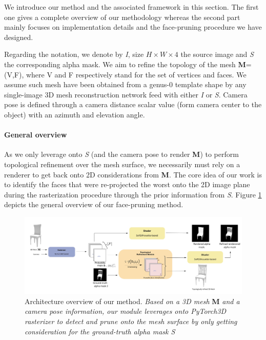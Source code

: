 We introduce our method and the associated framework in this section. The first one gives a complete overview of our methodology whereas the second part mainly focuses on implementation details and the face-pruning procedure we have designed. 

Regarding the notation, we denote by \textit{I}, size $H\times W \times 4$ the source image and \textit{S} the corresponding alpha mask. We aim to refine the topology of the mesh \textbf{M}=(V,F), where V and F respectively stand for the set of vertices and faces. We assume such mesh have been obtained from a genus-0 template shape by any single-image 3D mesh reconstruction network feed with either \textit{I} or \textit{S}. Camera pose is defined through a camera distance scalar value (form camera center to the object) with an azimuth and elevation angle. 

\paragraph{General overview} As we only leverage onto \textit{S} (and the camera pose to render \textbf{M}) to perform topological refinement over the mesh surface, we necessarily must rely on a renderer to get back onto 2D considerations from  \textbf{M}. The core idea of our work is to identify the faces that were re-projected the worst onto the 2D image plane during the rasterization procedure through the prior information from \textit{S}. Figure \ref{fig:pipeline_overview} depicts the general overview of our face-pruning method.

\begin{figure}[htp!]
\begin{center}
\includegraphics[width=\linewidth]{images/adaptativesr/final_figure.jpg}
\end{center}
    \caption{Architecture overview of our method. \textit{Based on a 3D mesh} \textbf{M} \textit{and a camera pose information, our module leverages onto PyTorch3D rasterizer to detect and prune onto the mesh surface by only getting consideration for the ground-truth alpha mask S}}
\label{fig:pipeline_overview}
\end{figure}

